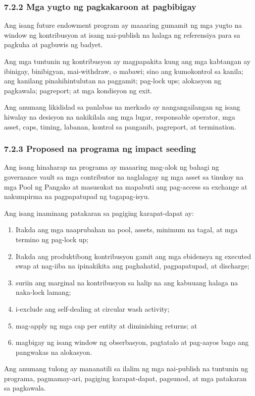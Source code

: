 \documentclass[11pt]{article}
\begin{document}
\subsubsection*{7.2.2 Mga yugto ng pagkakaroon at pagbibigay}

Ang isang future endowment program ay maaaring gumamit ng mga yugto na window ng kontribusyon at isang nai-publish na halaga ng referensiya para sa pagkuha at pagbuwis ng badyet.

Ang mga tuntunin ng kontribusyon ay magpapakita kung ang mga kabtangan ay ibinigay, binibigyan, mai-withdraw, o mabawi; sino ang kumokontrol sa kanila; ang kanilang pinahihintulutan na paggamit; pag-lock ups; alokasyon ng pagkawala; pagreport; at mga kondisyon ng exit.

Ang anumang likididad sa panlabas na merkado ay nangangailangan ng isang hiwalay na desisyon na nakikilala ang mga lugar, responsable operator, mga asset, caps, timing, labanan, kontrol sa panganib, pagreport, at termination.

\subsubsection*{7.2.3 Proposed na programa ng impact seeding}

Ang isang hinaharap na programa ay maaaring mag-alok ng bahagi ng governance vault sa mga contributor na naglalagay ng mga asset sa tinukoy na mga Pool ng Pangako at masusukat na mapabuti ang pag-access sa exchange at nakumpirma na pagpapatupad ng tagapag-isyu.

Ang isang inaminang patakaran sa pagiging karapat-dapat ay:

\begin{enumerate}[leftmargin=*]
\item Itakda ang mga naaprubahan na pool, assets, minimum na tagal, at mga termino ng pag-lock up;
\item Itakda ang produktibong kontribusyon gamit ang mga ebidensya ng executed swap at nag-iiba na ipinakikita ang paghahatid, pagpapatupad, at discharge;
\item suriin ang marginal na kontribusyon sa halip na ang kabuuang halaga na naka-lock lamang;
\item i-exclude ang self-dealing at circular wash activity;
\item mag-apply ng mga cap per entity at diminishing returns; at
\item magbigay ng isang window ng obserbasyon, pagtatalo at pag-aayos bago ang pangwakas na alokasyon.
\end{enumerate}
Ang anumang tulong ay mananatili sa ilalim ng mga nai-publish na tuntunin ng programa, pagmamay-ari, pagiging karapat-dapat, pagsunod, at mga patakaran sa pagkawala.
\end{document}
